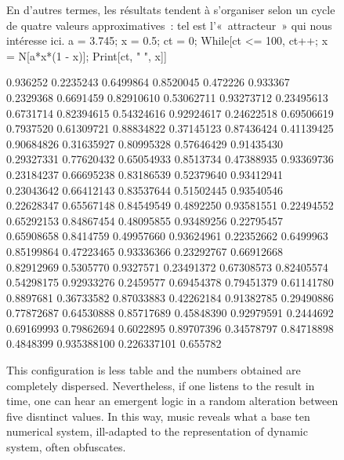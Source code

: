 \documentclass{article}
\begin{document}
\begin{figure}[h]
En d’autres termes, les résultats tendent à s’organiser selon un cycle de quatre valeurs approximatives : tel est l’« attracteur » qui nous intéresse ici.
a = 3.745; x = 0.5; ct = 0;
While[ct <= 100, ct++; x = N[a*x*(1 - x)];
Print[ct, "  ", x]]

0.936252  0.2235243  0.6499864  0.8520045
0.472226  0.933367  0.2329368  0.6691459
0.82910610  0.53062711  0.93273712  0.23495613
0.6731714  0.82394615  0.54324616  0.92924617
0.24622518  0.69506619  0.7937520  0.61309721
0.88834822  0.37145123  0.87436424  0.41139425
0.90684826  0.31635927  0.80995328  0.57646429
0.91435430  0.29327331  0.77620432  0.65054933
0.8513734  0.47388935  0.93369736  0.23184237
0.66695238  0.83186539  0.52379640  0.93412941
0.23043642  0.66412143  0.83537644  0.51502445
0.93540546  0.22628347  0.65567148  0.84549549
0.4892250  0.93581551  0.22494552  0.65292153
0.84867454  0.48095855  0.93489256  0.22795457
0.65908658  0.8414759  0.49957660  0.93624961
0.22352662  0.6499963  0.85199864  0.47223465
0.93336366  0.23292767  0.66912668  0.82912969
0.5305770  0.9327571  0.23491372  0.67308573
0.82405574  0.54298175  0.92933276  0.2459577
0.69454378  0.79451379  0.61141780  0.8897681
0.36733582  0.87033883  0.42262184  0.91382785
0.29490886  0.77872687  0.64530888  0.85717689
0.45848390  0.92979591  0.2444692  0.69169993
0.79862694  0.6022895  0.89707396  0.34578797
0.84718898  0.4848399  0.935388100  0.226337101
0.655782
\caption{This configuration is less table and the numbers obtained are
completely dispersed.  Nevertheless, if one listens to the result in time,
one can hear an emergent logic in a random alteration between five disntinct
values.  In this way, music reveals what a base ten numerical system,
ill-adapted to the representation of dynamic system, often obfuscates.}
\end{figure}
\end{document}
